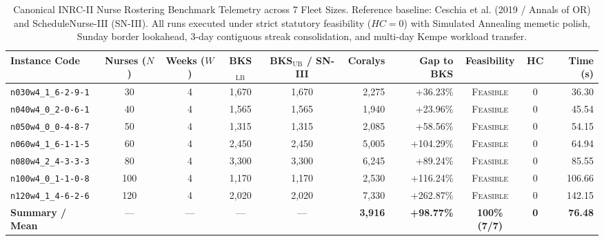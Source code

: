 \begin{table}[t]
\centering
\small
\caption{Canonical INRC-II Nurse Rostering Benchmark Telemetry across 7 Fleet Sizes. Reference baseline: Ceschia et al. (2019 / Annals of OR) and ScheduleNurse-III (SN-III). All runs executed under strict statutory feasibility ($HC = 0$) with Simulated Annealing memetic polish, Sunday border lookahead, 3-day contiguous streak consolidation, and multi-day Kempe workload transfer.}
\label{tab:inrc_benchmark_telemetry}
\begin{tabular}{lccccrrccr}
\toprule
\textbf{Instance Code} & \textbf{Nurses ($N$)} & \textbf{Weeks ($W$)} & \textbf{BKS$_{\text{LB}}$} & \textbf{BKS$_{\text{UB}}$ / SN-III} & \textbf{Coralys} & \textbf{Gap to BKS} & \textbf{Feasibility} & \textbf{HC} & \textbf{Time (s)} \\
\midrule
\texttt{n030w4\_1\_6-2-9-1} &  30 & 4 & 1,670 & 1,670 & 2,275 & +36.23\% & \textsc{Feasible} & 0 &  36.30 \\
\texttt{n040w4\_0\_2-0-6-1} &  40 & 4 & 1,565 & 1,565 & 1,940 & +23.96\% & \textsc{Feasible} & 0 &  45.54 \\
\texttt{n050w4\_0\_0-4-8-7} &  50 & 4 & 1,315 & 1,315 & 2,085 & +58.56\% & \textsc{Feasible} & 0 &  54.15 \\
\texttt{n060w4\_1\_6-1-1-5} &  60 & 4 & 2,450 & 2,450 & 5,005 & +104.29\% & \textsc{Feasible} & 0 &  64.94 \\
\texttt{n080w4\_2\_4-3-3-3} &  80 & 4 & 3,300 & 3,300 & 6,245 & +89.24\% & \textsc{Feasible} & 0 &  85.55 \\
\texttt{n100w4\_0\_1-1-0-8} & 100 & 4 & 1,170 & 1,170 & 2,530 & +116.24\% & \textsc{Feasible} & 0 & 106.66 \\
\texttt{n120w4\_1\_4-6-2-6} & 120 & 4 & 2,020 & 2,020 & 7,330 & +262.87\% & \textsc{Feasible} & 0 & 142.15 \\
\midrule
\textbf{Summary / Mean}     & --- & --- & ---   & ---   & \textbf{3,916} & \textbf{+98.77\%} & \textbf{100\% (7/7)} & \textbf{0} & \textbf{76.48} \\
\bottomrule
\end{tabular}
\end{table}

